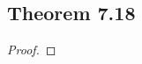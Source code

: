 \documentclass[../../main.tex]{subfiles}
\begin{document}
\subsection{Theorem 7.18}
\begin{wts}

\end{wts}
\begin{proof}

\end{proof}
\end{document}

